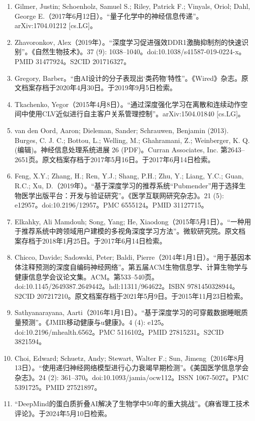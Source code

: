 \begin{enumerate}
\item Gilmer, Justin; Schoenholz, Samuel S.; Riley, Patrick F.; Vinyals, Oriol; Dahl, George E.（2017年6月12日）。“量子化学中的神经信息传递”。arXiv:1704.01212 [cs.LG]。
\item Zhavoronkov, Alex（2019年）。“深度学习促进强效DDR1激酶抑制剂的快速识别”。《自然生物技术》。37 (9): 1038–1040。doi:10.1038/s41587-019-0224-x。PMID 31477924。S2CID 201716327。
\item Gregory, Barber。“由AI设计的分子表现出‘类药物’特性”。《Wired》杂志。原文档案存档于2020年4月30日。于2019年9月5日检索。
\item Tkachenko, Yegor（2015年4月8日）。“通过深度强化学习在离散和连续动作空间中使用CLV近似进行自主客户关系管理控制”。arXiv:1504.01840 [cs.LG]。
\item van den Oord, Aaron; Dieleman, Sander; Schrauwen, Benjamin (2013). Burges, C. J. C.; Bottou, L.; Welling, M.; Ghahramani, Z.; Weinberger, K. Q. (编辑)。神经信息处理系统进展 26 (PDF)。Curran Associates, Inc. 第2643–2651页。原文档案存档于2017年5月16日。于2017年6月14日检索。
\item Feng, X.Y.; Zhang, H.; Ren, Y.J.; Shang, P.H.; Zhu, Y.; Liang, Y.C.; Guan, R.C.; Xu, D.（2019年）。“基于深度学习的推荐系统“Pubmender”用于选择生物医学出版平台：开发与验证研究”。《医学互联网研究杂志》。21 (5): e12957。doi:10.2196/12957。PMC 6555124。PMID 31127715。
\item Elkahky, Ali Mamdouh; Song, Yang; He, Xiaodong（2015年5月1日）。“一种用于推荐系统中跨领域用户建模的多视角深度学习方法”。微软研究院。原文档案存档于2018年1月25日。于2017年6月14日检索。
\item Chicco, Davide; Sadowski, Peter; Baldi, Pierre（2014年1月1日）。“用于基因本体注释预测的深度自编码神经网络”。第五届ACM生物信息学、计算生物学与健康信息学会议论文集。ACM。第533–540页。doi:10.1145/2649387.2649442。hdl:11311/964622。ISBN 9781450328944。S2CID 207217210。原文档案存档于2021年5月9日。于2015年11月23日检索。
\item Sathyanarayana, Aarti（2016年1月1日）。“基于深度学习的可穿戴数据睡眠质量预测”。《JMIR移动健康与u健康》。4 (4): e125。doi:10.2196/mhealth.6562。PMC 5116102。PMID 27815231。S2CID 3821594。
\item Choi, Edward; Schuetz, Andy; Stewart, Walter F.; Sun, Jimeng（2016年8月13日）。“使用递归神经网络模型进行心力衰竭早期检测”。《美国医学信息学会杂志》。24 (2): 361–370。doi:10.1093/jamia/ocw112。ISSN 1067-5027。PMC 5391725。PMID 27521897。
\item “DeepMind的蛋白质折叠AI解决了生物学中50年的重大挑战”。《麻省理工技术评论》。于2024年5月10日检索。

\end{enumerate}
